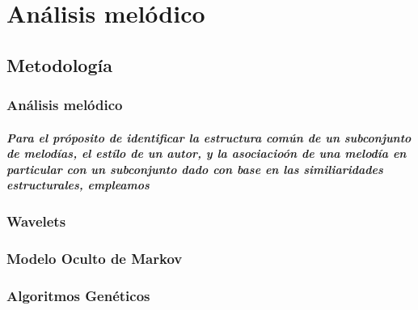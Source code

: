 \chapter{Análisis melódico}
\section{Metodología}
\subsection{Análisis melódico}

\paragraph{Para el próposito de identificar la estructura común de un subconjunto de melodías, el estílo de un autor, y la asociacioón de una melodía en particular con un subconjunto dado con base en las similiaridades estructurales, empleamos}

\subsection{Wavelets}
\subsection{Modelo Oculto de Markov}
\subsection{Algoritmos Genéticos}
